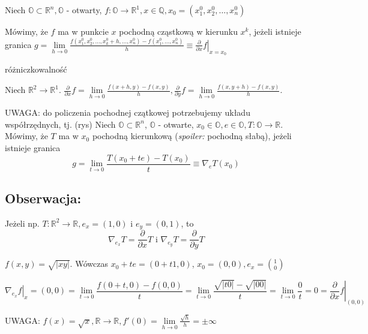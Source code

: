 \documentclass[../main.tex]{subfiles}
\begin{document}
Niech $\mathbb{O}\subset\mathbb{R}^{n}, \mathbb{O}$ - otwarty,
$f: \mathbb{O}\to\mathbb{R}^{1}, x\in\mathbb{Q}, x_0 = (x_1^0,x_2^0,\dots,x_n^0)$

Mówimy, że $f$ ma w punkcie $x$ pochodną cząstkową w kierunku $x^k$, jeżeli istnieje granica $g = \lim\limits_{h \to 0}\frac{f(x_1^0, x_2^0, \dots, x_k^0 + h, \dots, x_n^0) - f(x_1^0,\dots,x_n^0)}{h} \equiv \left. \frac{\partial}{\partial x} f \right |_{x=x_0}$

    \begin{przyklad}
        różniczkowalność
    \end{przyklad}

Niech $\mathbb{R}^{2}\to\mathbb{R}^{1}$. $\frac{\partial}{\partial x} f = \lim\limits_{h \to 0}\frac{f(x+h,y) - f(x,y)}{h}, \frac{\partial}{\partial y} f = \lim\limits_{h \to 0}\frac{f(x,y+h) - f(x,y)}{h}$.\\
\vspace{0.3cm}

UWAGA: do policzenia pochodnej czątkowej potrzebujemy układu współrzędnych, tj. (rys)
\vspace{0.3cm}
Niech $\mathbb{O}\subset\mathbb{R}^{n}$, $\mathbb{O}$ - otwarte, $x_0\in\mathbb{O},e\in\mathbb{O},T:\mathbb{O}\to\mathbb{R}$.\\
Mówimy, że $T$ ma w $x_0$ pochodną kierunkową (\textit{spoiler:} pochodną słabą), jeżeli istnieje granica $$g = \lim\limits_{t \to 0}\frac{T(x_0 +te) - T(x_0)}{t} \equiv \nabla_e T(x_0)$$
\subsection{
    Obserwacja:
}
Jeżeli np. $T: \mathbb{R}^{2}\to\mathbb{R}, e_x=(1,0)$ i $e_y = (0,1)$, to $$\nabla_{e_{x}} T = \frac{\partial}{\partial x} T \text{ i } \nabla_{e_{y}} T = \frac{\partial}{\partial y} T$$

\begin{przyklad}

\end{przyklad}
$f(x,y) = \sqrt{|xy|}$. Wówczas $x_0 + te = (0+t1,0)$, $x_0 = (0,0), e_x = \binom{1}{0}$

$$\left. \nabla_{e_x} f \right |_x=(0,0) = \lim\limits_{t \to 0}\frac{f(0+t,0) - f(0,0)}{t} = \lim\limits_{t \to 0}\frac{\sqrt{|t 0|} - \sqrt{|0 0|}}{t} = \lim\limits_{t \to 0}\frac{0}{t} = 0 = \left. \frac{\partial}{\partial x} f\right |_{(0,0)}$$

UWAGA: $f(x) = \sqrt{x}, \mathbb{R}\to\mathbb{R}, f'(0) = \lim\limits_{h \to 0}\frac{\sqrt{h}}{h} = \pm \infty$
\end{document}
